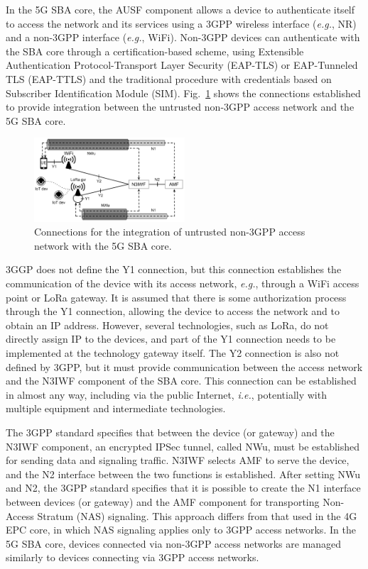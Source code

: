 In the 5G SBA core, the AUSF component allows a device to authenticate itself to access the network and its services using a 3GPP wireless interface (\textit{e.g.}, NR) and a non-3GPP interface (\textit{e.g.}, WiFi). Non-3GPP devices can authenticate with the SBA core through a certification-based scheme, using Extensible Authentication Protocol-Transport Layer Security (EAP-TLS) or EAP-Tunneled TLS (EAP-TTLS) and the traditional procedure with credentials based on Subscriber Identification Module (SIM). Fig.~\ref{fig:non3gpp_connections} shows the connections established to provide integration between the untrusted non-3GPP access network and the 5G SBA core.

\begin{figure}[htb]
 \begin{center}
\includegraphics[width=0.5\textwidth]{figs/non3GPP_connections.pdf}
  \end{center}
\caption{Connections for the integration of untrusted non-3GPP access network with the 5G SBA core.}  
\label{fig:non3gpp_connections}
\end{figure}


3GGP does not define the Y1 connection, but this connection establishes the communication of the device with its access network, \textit{e.g.}, through a WiFi access point or LoRa gateway. It is assumed that there is some authorization process through the Y1 connection, allowing the device to access the network and to obtain an IP address. However, several technologies, such as LoRa, do not directly assign IP to the devices, and part of the Y1 connection needs to be implemented at the technology gateway itself. The Y2 connection is also not defined by 3GPP, but it must provide communication between the access network and the N3IWF component of the SBA core. This connection can be established in almost any way, including via the public Internet, \textit{i.e.}, potentially with multiple equipment and intermediate technologies.

The 3GPP standard specifies that between the device (or gateway) and the N3IWF component, an encrypted IPSec tunnel, called NWu, must be established for sending data and signaling traffic. N3IWF selects AMF to serve the device, and the N2 interface between the two functions is established. After setting NWu and N2, the 3GPP standard specifies that it is possible to create the N1 interface between devices (or gateway) and the AMF component for transporting Non-Access Stratum (NAS) signaling. This approach differs from that used in the 4G EPC core, in which NAS signaling applies only to 3GPP access networks. In the 5G SBA core, devices connected via non-3GPP access networks are managed similarly to devices connecting via 3GPP access networks.


